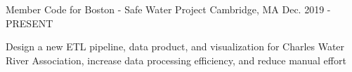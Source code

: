 

\begin{cventries}

  \cventry
    {Member} %
    {Code for Boston - Safe Water Project} %
    {Cambridge, MA} %
    {Dec. 2019 - PRESENT} %
    {
      \begin{cvitems} %
        \item {Design a new ETL pipeline, data product, and visualization for Charles Water River Association, 
        increase data processing efficiency,
        and reduce manual effort}
      \end{cvitems}
    }

\end{cventries}
